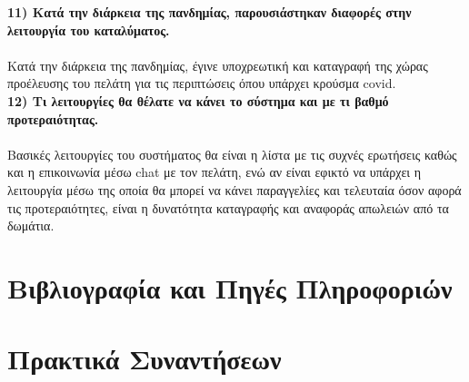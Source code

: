 \noindent
\textbf{11) Κατά την διάρκεια της πανδημίας, παρουσιάστηκαν διαφορές στην
	λειτουργία του καταλύματος.} \\ \\
Κατά την διάρκεια της πανδημίας, έγινε υποχρεωτική και καταγραφή της χώρας
προέλευσης του πελάτη για τις περιπτώσεις όπου υπάρχει κρούσμα covid. \\ 

\noindent
\textbf{12) Τι λειτουργίες θα θέλατε να κάνει το σύστημα και με τι βαθμό 
	προτεραιότητας.} \\ \\
Βασικές λειτουργίες του συστήματος θα είναι η λίστα με τις συχνές ερωτήσεις 
καθώς και η επικοινωνία μέσω chat με τον πελάτη, ενώ αν είναι εφικτό να υπάρχει
η λειτουργία μέσω της οποία θα μπορεί να κάνει παραγγελίες και τελευταία όσον 
αφορά τις προτεραιότητες, είναι η δυνατότητα καταγραφής και αναφοράς απωλειών
από τα δωμάτια. 

\section{Βιβλιογραφία και Πηγές Πληροφοριών}
\section{Πρακτικά Συναντήσεων}